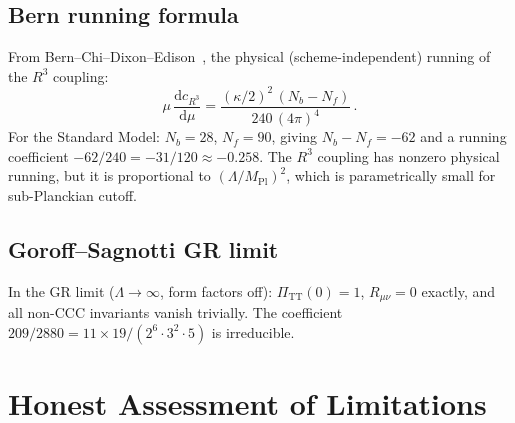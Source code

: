 \documentclass[11pt,a4paper]{article}
\newcommand{\dd}{\mathrm{d}}
\newcommand{\PiTT}{\Pi_{\mathrm{TT}}}
\newcommand{\MPl}{M_{\mathrm{Pl}}}
\begin{document}
\subsection{Bern running formula}

From Bern--Chi--Dixon--Edison~\cite{Bern:2017}, the physical
(scheme-independent) running of the $R^3$ coupling:
\begin{equation}
  \mu\,\frac{\dd c_{R^3}}{\dd\mu}
  = \frac{(\kappa/2)^2\,(N_b-N_f)}{240\,(4\pi)^4}\,.
\end{equation}
For the Standard Model: $N_b=28$, $N_f=90$, giving
$N_b-N_f=-62$ and a running coefficient $-62/240=-31/120\approx-0.258$.
The $R^3$ coupling has nonzero physical running, but it is proportional
to $(\Lambda/\MPl)^2$, which is parametrically small for sub-Planckian
cutoff.

\subsection{Goroff--Sagnotti GR limit}

In the GR limit ($\Lambda\to\infty$, form factors off):
$\PiTT(0)=1$, $R_{\mu\nu}=0$ exactly, and all non-CCC invariants vanish
trivially.  The coefficient $209/2880=11\times 19/(2^6\cdot 3^2\cdot 5)$
is irreducible.


\section{Honest Assessment of Limitations}
\label{sec:limitations}
\end{document}
